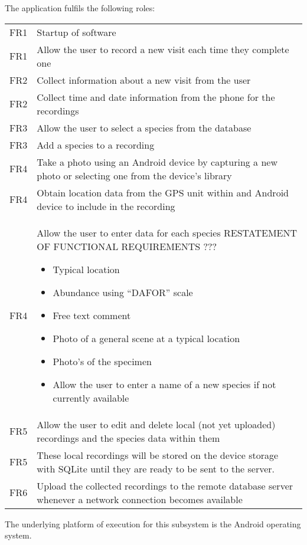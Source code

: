 	The application fulfils the following roles:\\
	\begin{tabular}{r | p{15cm}}
		FR1 & Startup of software \\
		FR1 & Allow the user to record a new visit each time they complete one \\
		FR2 & Collect information about a new visit from the user \\
		FR2 & Collect time and date information from the phone for the recordings \\
		FR3 & Allow the user to select a species from the database \\
		FR3 & Add a species to a recording \\
		FR4 & Take a photo using an Android device by capturing a new photo or selecting one from the device's library \\
		FR4 & Obtain location data from the GPS unit within and Android device to include in the recording \\
		FR4 & Allow the user to enter data for each species
		RESTATEMENT OF FUNCTIONAL REQUIREMENTS ???
		\begin{itemize}
			\item Typical location
			\item Abundance using ``DAFOR'' scale
			\item Free text comment
			\item Photo of a general scene at a typical location
			\item Photo's of the specimen
			\item Allow the user to enter a name of a new species if not currently available
		\end{itemize} \\
		FR5 & Allow the user to edit and delete local (not yet uploaded) recordings and the species data within them \\
		FR5 & These local recordings will be stored on the device storage with SQLite until they are ready to be sent to the server. \\
		FR6 & Upload the collected recordings to the remote database server whenever a network connection becomes available \\
    \end{tabular}
    
    The underlying platform of execution for this subsystem is the Android operating system.
    
